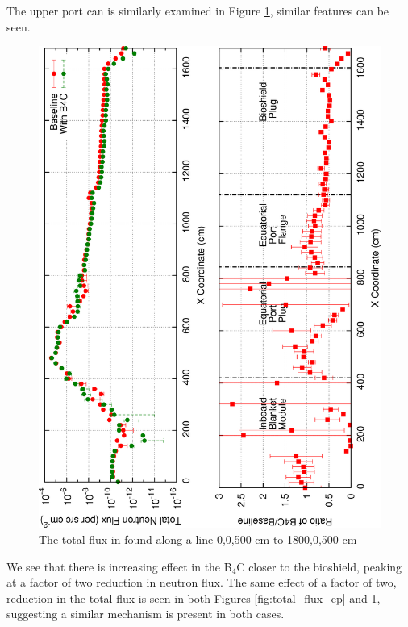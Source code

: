 \documentclass[12pt]{article}
\begin{document}
\newpage
\clearpage
The upper port can is similarly examined in Figure \ref{fig:total_flux_up},
similar features can be seen.
\begin{figure}[ht!]
  \centering
  \includegraphics[angle=-90,clip,scale=0.15]{../plots/neutron/total_flux_up.png}     
  \caption{The total flux in found along a line 0,0,500 cm to 1800,0,500 cm}
  \label{fig:total_flux_up}
\end{figure}
We see that there is increasing effect in the B$_4$C closer to the bioshield, peaking
at a factor of two reduction in neutron flux. The same effect of a factor of two, reduction
in the total flux is seen in both Figures \ref{fig:total_flux_ep} and \ref{fig:total_flux_up}, 
suggesting a similar mechanism is present in both cases. 
\end{document}

